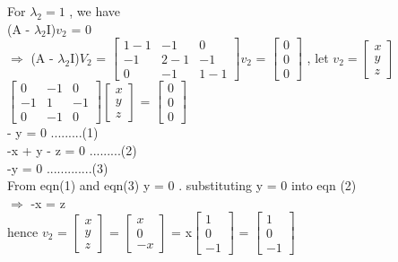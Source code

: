 \documentclass[12pt,a4paper]{article}
\begin{document}
 
 For $\lambda_2 = 1$ , we have \\
 (A - $\lambda_2$I)$v_2$ = 0\vspace{5mm}\\
 $\Longrightarrow$ (A - $\lambda_2$I)$V_2$ = $\begin{bmatrix}
 1 - 1&-1&0\\ -1&2 - 1&-1\\ 0&-1&1 - 1
 \end{bmatrix}v_2$ = $\begin{bmatrix}
 0\\0\\0
 \end{bmatrix}$ , let $v_2 = \begin{bmatrix}
 x\\y\\z
 \end{bmatrix}$\vspace{5mm}\\
 $\begin{bmatrix}
 0&-1&0\\ -1&1&-1\\ 0&-1&0
 \end{bmatrix}\begin{bmatrix}
 x\\y\\z
 \end{bmatrix}$ = $\begin{bmatrix}
 0\\0\\0
 \end{bmatrix}$\vspace{5mm}\\
 - y = 0 .........(1)\\
 -x + y - z = 0 .........(2)\\
 -y = 0 .............(3)\\
 From eqn(1) and eqn(3) y = 0 . substituting y = 0 into eqn (2)\\
 $\Longrightarrow$ -x = z\vspace{5mm}\\
 hence $v_2$ = $\begin{bmatrix}
 x\\y\\z
 \end{bmatrix}$ =  $\begin{bmatrix}
 x\\0\\-x
 \end{bmatrix}$ = x$\begin{bmatrix}
 1\\0\\-1
 \end{bmatrix}$ = $\begin{bmatrix}
 1\\0\\-1
 \end{bmatrix}$ 
 
\end{document}
